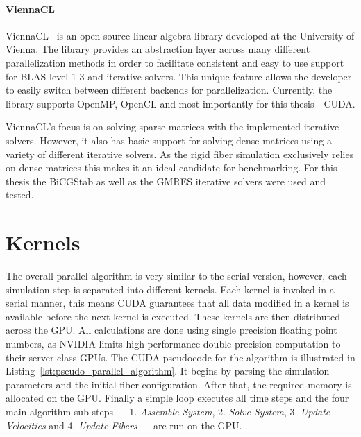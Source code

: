 \paragraph{ViennaCL}
ViennaCL~\cite{ViennaCLDocumentation} is an open-source linear algebra library developed at the University of Vienna. The library provides an abstraction layer across many different parallelization methods in order to facilitate consistent and easy to use support for BLAS level 1-3 and iterative solvers. This unique feature allows the developer to easily switch between different backends for parallelization. Currently, the library supports OpenMP, OpenCL and most importantly for this thesis - CUDA.

ViennaCL's focus is on solving sparse matrices with the implemented iterative solvers. However, it also has basic support for solving dense matrices using a variety of different iterative solvers. As the rigid fiber simulation exclusively relies on dense matrices this makes it an ideal candidate for benchmarking. For this thesis the BiCGStab as well as the GMRES iterative solvers were used and tested.

\section{Kernels}
\label{sec:kernels}

The overall parallel algorithm is very similar to the serial version, however, each simulation step is separated into different kernels. Each kernel is invoked in a serial manner, this means CUDA guarantees that all data modified in a kernel is available before the next kernel is executed. These kernels are then distributed across the GPU. All calculations are done using single precision floating point numbers, as NVIDIA limits high performance double precision computation to their server class GPUs. The CUDA pseudocode for the algorithm is illustrated in Listing~\ref{lst:pseudo_parallel_algorithm}. It begins by parsing the simulation parameters and the initial fiber configuration. After that, the required memory is allocated on the GPU. Finally a simple loop executes all time steps and the four main algorithm sub steps — 1. \emph{Assemble System}, 2. \emph{Solve System}, 3. \emph{Update Velocities} and 4. \emph{Update Fibers} — are run on the GPU.

